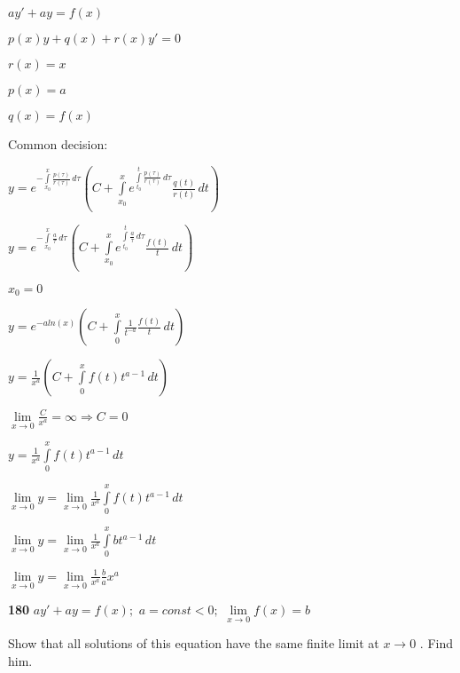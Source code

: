 \documentclass{article}
\begin{document}
\begin{left}
\begin{spacing}{1.5}
$ay'+ay=f(x)$

$p(x)y+q(x)+r(x)y'=0$

$r(x)=x$

$p(x)=a$

$q(x)=f(x)$

\end{spacing}
\end{left}
Common decision:
\begin{left}
\begin{spacing}{1.8}
$\displaystyle y= e^{-\int\limits _{x_0}^x \frac{p(\tau)}{r(\tau)}\,d\tau} (C+\int\limits _{x_0}^x e^{\int\limits _{t_0}^t\frac{p(\tau)}{r(\tau)}\,d\tau}\frac{q(t)}{r(t)}\,dt)$

$\displaystyle y= e^{-\int\limits _{x_0}^x \frac{a}{\tau}\,d\tau} (C+\int\limits _{x_0}^x e^{\int\limits _{t_0}^t\frac{a}{\tau}\,d\tau}\frac{f(t)}{t}\,dt)$
\end{spacing}
\end{left}
$x_0=0$
\begin{left}
\begin{spacing}{3}
$\displaystyle y= e^{-aln(x)} (C+\int\limits _0^x \frac{1}{t^{-a}}\frac{f(t)}{t}\,dt)$

$\displaystyle y= \frac{1}{x^a} (C+\int\limits _0^x f(t)t^{a-1}\,dt)$

$\displaystyle \lim\limits_{x \to 0} \frac{C}{x^a} = \infty \Rightarrow C=0$

$\displaystyle y= \frac{1}{x^a}\int\limits _0^x f(t)t^{a-1}\,dt$

$\displaystyle \lim\limits_{x \to 0}y= \lim\limits_{x \to 0}\frac{1}{x^a}\int\limits _0^x f(t)t^{a-1}\,dt$

$\displaystyle \lim\limits_{x \to 0}y= \lim\limits_{x \to 0}\frac{1}{x^a}\int\limits _0^x bt^{a-1}\,dt$

$\displaystyle \lim\limits_{x \to 0}y= \lim\limits_{x \to 0}\frac{1}{x^a}\frac{b}{a}x^a$

\end{spacing}
\end{left}
\begin{flushleft}
{\bf 180 } $ay'+ay=f(x); $ $a=const<0; $ $\lim\limits_{x \to 0} f(x) = b$

\end{flushleft}
Show that all solutions of this equation have the same finite limit at $x \rightarrow 0$ . Find him.
\end{document}

